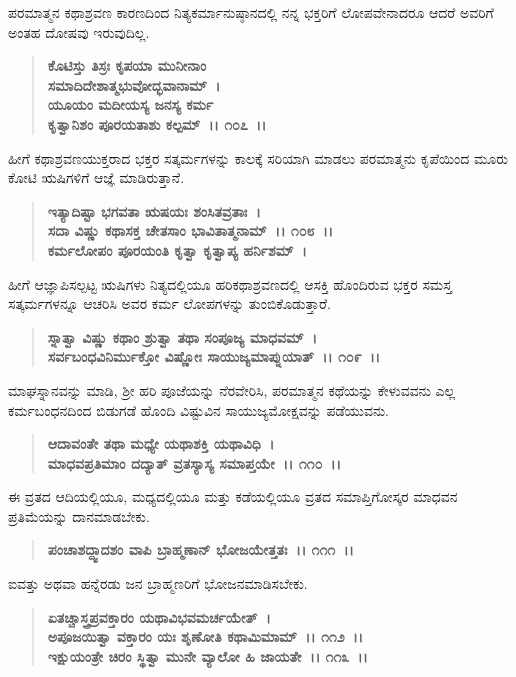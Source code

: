 ಪರಮಾತ್ಮನ ಕಥಾಶ್ರವಣ ಕಾರಣದಿಂದ ನಿತ್ಯಕರ್ಮಾನುಷ್ಠಾನದಲ್ಲಿ ನನ್ನ ಭಕ್ತರಿಗೆ ಲೋಪವೇನಾದರೂ ಆದರೆ ಅವರಿಗೆ ಅಂತಹ ದೋಷವು ಇರುವುದಿಲ್ಲ.

\begin{verse}
\textbf{ಕೊಟಿಸ್ತು ತಿಸ್ರಃ ಕೃಪಯಾ ಮುನೀನಾಂ}\\\textbf{ಸಮಾದಿದೇಶಾತ್ಮಭುವೋದ್ಭವಾನಾಮ್~।}\\\textbf{ಯೂಯಂ ಮದೀಯಸ್ಯ ಜನಸ್ಯ ಕರ್ಮ} \\\textbf{ಕೃತ್ವಾನಿಶಂ ಪೂರಯತಾಶು ಕಲ್ಪಮ್~।। ೧೦೭~।।}
\end{verse}

ಹೀಗೆ ಕಥಾಶ್ರವಣಯುಕ್ತರಾದ ಭಕ್ತರ ಸತ್ಕರ್ಮಗಳನ್ನು ಕಾಲಕ್ಕೆ ಸರಿಯಾಗಿ ಮಾಡಲು ಪರಮಾತ್ಮನು ಕೃಪೆಯಿಂದ ಮೂರು ಕೋಟಿ ಋಷಿಗಳಿಗೆ ಆಜ್ಞೆ ಮಾಡಿರುತ್ತಾನೆ.

\begin{verse}
\textbf{ಇತ್ಯಾದಿಷ್ಟಾ ಭಗವತಾ ಋಷಯಃ ಶಂಸಿತವ್ರತಾಃ~।}\\\textbf{ಸದಾ ವಿಷ್ಣು ಕಥಾಸಕ್ತ ಚೇತಸಾಂ ಭಾವಿತಾತ್ಮನಾಮ್~।। ೧೦೮~।। }\\\textbf{ಕರ್ಮಲೋಪಂ ಪೂರಯಂತಿ ಕೃತ್ವಾ ಕೃತ್ವಾಪ್ಯ ಹರ್ನಿಶಮ್~।}
\end{verse}

ಹೀಗೆ ಆಜ್ಞಾಪಿಸಲ್ಪಟ್ಟ ಋಷಿಗಳು ನಿತ್ಯದಲ್ಲಿಯೂ ಹರಿಕಥಾಶ್ರವಣದಲ್ಲಿ ಆಸಕ್ತಿ ಹೊಂದಿರುವ ಭಕ್ತರ ಸಮಸ್ತ ಸತ್ಕರ್ಮಗಳನ್ನೂ ಆಚರಿಸಿ ಅವರ ಕರ್ಮ ಲೋಪಗಳನ್ನು ತುಂಬಿಕೊಡುತ್ತಾರೆ.

\begin{verse}
\textbf{ಸ್ನಾತ್ವಾ ವಿಷ್ಣು ಕಥಾಂ ಶ್ರುತ್ವಾ ತಥಾ ಸಂಪೂಜ್ಯ ಮಾಧವಮ್~।}\\\textbf{ಸರ್ವಬಂಧವಿನಿರ್ಮುಕ್ತೋ ವಿಷ್ಣೋಃ ಸಾಯುಜ್ಯಮಾಪ್ನುಯಾತ್~।। ೧೦೯~।।}
\end{verse}

ಮಾಘಸ್ನಾನವನ್ನು ಮಾಡಿ, ಶ‍್ರೀ ಹರಿ ಪೂಜೆಯನ್ನು ನೆರವೇರಿಸಿ, ಪರಮಾತ್ಮನ ಕಥೆಯನ್ನು ಕೇಳುವವನು ಎಲ್ಲ ಕರ್ಮಬಂಧನದಿಂದ ಬಿಡುಗಡೆ ಹೊಂದಿ ವಿಷ್ಟುವಿನ ಸಾಯುಜ್ಯಮೋಕ್ಷವನ್ನು ಪಡೆಯುವನು.

\begin{verse}
\textbf{ಆದಾವಂತೇ ತಥಾ ಮಧ್ಯೇ ಯಥಾಶಕ್ತಿ ಯಥಾವಿಧಿ~।}\\\textbf{ಮಾಧವಪ್ರತಿಮಾಂ ದದ್ಯಾತ್ ವ್ರತಸ್ಯಾಸ್ಯ ಸಮಾಪ್ತಯೇ~।। ೧೧೦~।।}
\end{verse}

ಈ ವ್ರತದ ಆದಿಯಲ್ಲಿಯೂ, ಮಧ್ಯದಲ್ಲಿಯೂ ಮತ್ತು ಕಡೆಯಲ್ಲಿಯೂ ವ್ರತದ ಸಮಾಪ್ತಿಗೋಸ್ಕರ ಮಾಧವನ ಪ್ರತಿಮೆಯನ್ನು ದಾನಮಾಡಬೇಕು.

\begin{verse}
\textbf{ಪಂಚಾಶದ್ದ್ವಾದಶಂ ವಾಪಿ ಬ್ರಾಹ್ಮಣಾನ್ ಭೋಜಯೇತ್ತತಃ~।। ೧೧೧~।।}
\end{verse}

ಐವತ್ತು ಅಥವಾ ಹನ್ನೆರಡು ಜನ ಬ್ರಾಹ್ಮಣರಿಗೆ ಭೋಜನಮಾಡಿಸಬೇಕು.

\begin{verse}
\textbf{ಏತಚ್ಚಾಸ್ತ್ರಪ್ರವಕ್ತಾರಂ ಯಥಾವಿಭವಮರ್ಚಯೇತ್~।}\\\textbf{ಅಪೂಜಯಿತ್ವಾ ವಕ್ತಾರಂ ಯಃ ಶೃಣೋತಿ ಕಥಾಮಿಮಾಮ್~।। ೧೧೨~।। }\\\textbf{ಇಕ್ಷುಯಂತ್ರೇ ಚಿರಂ ಸ್ಥಿತ್ವಾ ಮುನೇ ವ್ಯಾಲೋ ಹಿ ಜಾಯತೇ~।। ೧೧೩~।।}
\end{verse}

